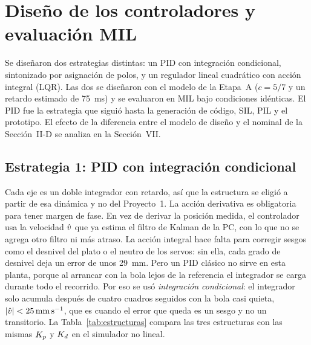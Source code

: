 \section{Diseño de los controladores y evaluación MIL}

Se diseñaron dos estrategias distintas: un PID con integración condicional, sintonizado por
asignación de polos, y un regulador lineal cuadrático con acción integral (LQR). Las dos se
diseñaron con el modelo de la Etapa~A ($c = 5/7$ y un retardo estimado de
\SI{75}{\milli\second}) y se evaluaron en MIL bajo condiciones idénticas. El PID fue la estrategia
que siguió hasta la generación de código, SIL, PIL y el prototipo. El efecto de la diferencia
entre el modelo de diseño y el nominal de la Sección~II-D se analiza en la Sección~VII.

\subsection{Estrategia 1: PID con integración condicional}

Cada eje es un doble integrador con retardo, así que la estructura se eligió a partir de esa
dinámica y no del Proyecto~1. La acción derivativa es obligatoria para tener margen de fase. En
vez de derivar la posición medida, el controlador usa la velocidad $\hat{v}$ que ya estima el filtro
de Kalman de la PC, con lo que no se agrega otro filtro ni más atraso. La acción integral hace
falta para corregir sesgos como el desnivel del plato o el neutro de los servos: sin ella, cada
grado de desnivel deja un error de unos \SI{29}{\milli\metre}. Pero un PID clásico no sirve en
esta planta, porque al arrancar con la bola lejos de la referencia el integrador se carga durante
todo el recorrido. Por eso se usó \emph{integración condicional}: el integrador solo acumula
después de cuatro cuadros seguidos con la bola casi quieta, $|\hat{v}| < \SI{25}{\milli\metre\per\second}$,
que es cuando el error que queda es un sesgo y no un transitorio. La Tabla~\ref{tab:estructuras}
compara las tres estructuras con las mismas $K_p$ y $K_d$ en el simulador no lineal.

